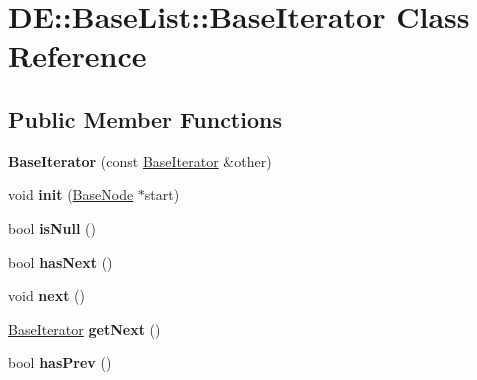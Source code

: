 \hypertarget{classDE_1_1BaseList_1_1BaseIterator}{}\section{DE\+:\+:Base\+List\+:\+:Base\+Iterator Class Reference}
\label{classDE_1_1BaseList_1_1BaseIterator}
\subsection*{Public Member Functions}
\begin{DoxyCompactItemize}
\item 
{\bfseries Base\+Iterator} (const \hyperlink{classDE_1_1BaseList_1_1BaseIterator}{Base\+Iterator} \&other)\hypertarget{classDE_1_1BaseList_1_1BaseIterator_ac721c46b8e92ab27a2276009ae9b4958}{}\label{classDE_1_1BaseList_1_1BaseIterator_ac721c46b8e92ab27a2276009ae9b4958}

\item 
void {\bfseries init} (\hyperlink{classDE_1_1BaseList_1_1BaseNode}{Base\+Node} $\ast$start)\hypertarget{classDE_1_1BaseList_1_1BaseIterator_a66520bed5f88fbde92bfdb8bae963853}{}\label{classDE_1_1BaseList_1_1BaseIterator_a66520bed5f88fbde92bfdb8bae963853}

\item 
bool {\bfseries is\+Null} ()\hypertarget{classDE_1_1BaseList_1_1BaseIterator_a8d8d7cdb1fbe7f3f83f050dfe0be8b5c}{}\label{classDE_1_1BaseList_1_1BaseIterator_a8d8d7cdb1fbe7f3f83f050dfe0be8b5c}

\item 
bool {\bfseries has\+Next} ()\hypertarget{classDE_1_1BaseList_1_1BaseIterator_ab66f470e91d4f6240f9b47455f5b9515}{}\label{classDE_1_1BaseList_1_1BaseIterator_ab66f470e91d4f6240f9b47455f5b9515}

\item 
void {\bfseries next} ()\hypertarget{classDE_1_1BaseList_1_1BaseIterator_a14c54397d923df4866faf093e3921dc9}{}\label{classDE_1_1BaseList_1_1BaseIterator_a14c54397d923df4866faf093e3921dc9}

\item 
\hyperlink{classDE_1_1BaseList_1_1BaseIterator}{Base\+Iterator} {\bfseries get\+Next} ()\hypertarget{classDE_1_1BaseList_1_1BaseIterator_aa0c954b78cea1c33c5dd92ff02b7391f}{}\label{classDE_1_1BaseList_1_1BaseIterator_aa0c954b78cea1c33c5dd92ff02b7391f}

\item 
bool {\bfseries has\+Prev} ()\hypertarget{classDE_1_1BaseList_1_1BaseIterator_a6b288184084bb6c601eca349c44bdfa1}{}\label{classDE_1_1BaseList_1_1BaseIterator_a6b288184084bb6c601eca349c44bdfa1}


\end{DoxyCompactItemize}
